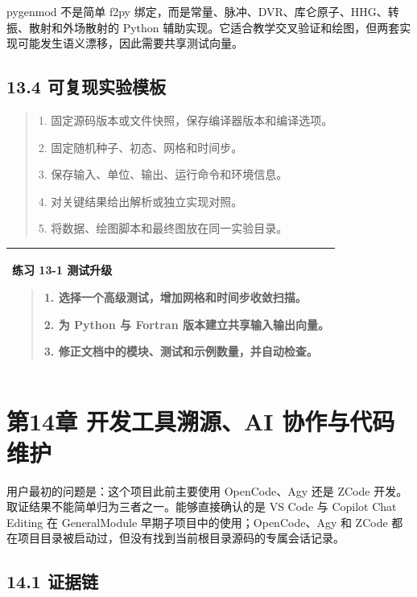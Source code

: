 \documentclass[UTF8,openany,11pt,fontset=fandol]{ctexbook}
\begin{document}
pygenmod 不是简单 f2py
绑定，而是常量、脉冲、DVR、库仑原子、HHG、转振、散射和外场散射的 Python
辅助实现。它适合教学交叉验证和绘图，但两套实现可能发生语义漂移，因此需要共享测试向量。

\section{\texorpdfstring{\textbf{13.4
可复现实验模板}}{13.4 可复现实验模板}}\label{ux53efux590dux73b0ux5b9eux9a8cux6a21ux677f}

\begin{quote}
1. 固定源码版本或文件快照，保存编译器版本和编译选项。

2. 固定随机种子、初态、网格和时间步。

3. 保存输入、单位、输出、运行命令和环境信息。

4. 对关键结果给出解析或独立实现对照。

5. 将数据、绘图脚本和最终图放在同一实验目录。
\end{quote}

\begin{longtable}[]{@{}l@{}}
\toprule
\endhead
\begin{minipage}[t]{0.97\columnwidth}\raggedright
\textbf{练习 13-1 测试升级}

\begin{quote}
1. 选择一个高级测试，增加网格和时间步收敛扫描。

2. 为 Python 与 Fortran 版本建立共享输入输出向量。

3. 修正文档中的模块、测试和示例数量，并自动检查。
\end{quote}\strut
\end{minipage}\tabularnewline
\bottomrule
\end{longtable}

\chapter{第14章 开发工具溯源、AI 协作与代码维护}\label{ux7b2c14ux7ae0-ux5f00ux53d1ux5de5ux5177ux6eafux6e90ai-ux534fux4f5cux4e0eux4ee3ux7801ux7ef4ux62a4}

用户最初的问题是：这个项目此前主要使用 OpenCode、Agy 还是 ZCode
开发。取证结果不能简单归为三者之一。能够直接确认的是 VS Code 与 Copilot
Chat Editing 在 GeneralModule 早期子项目中的使用；OpenCode、Agy 和 ZCode
都在项目目录被启动过，但没有找到当前根目录源码的专属会话记录。

\section{\texorpdfstring{\textbf{14.1
证据链}}{14.1 证据链}}\label{ux8bc1ux636eux94fe}
\end{document}
